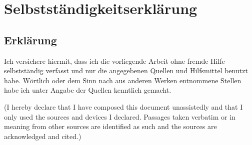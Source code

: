 \chapter*{Selbstständigkeitserklärung} %

\vspace{2cm}

\section*{Erklärung}

Ich versichere hiermit, dass ich die vorliegende Arbeit ohne fremde Hilfe selbstständig verfasst und nur die angegebenen Quellen und Hilfsmittel benutzt habe. Wörtlich oder dem Sinn nach aus anderen Werken entnommene Stellen habe ich unter Angabe der Quellen kenntlich gemacht.

\medskip
\noindent (I hereby declare that I have composed this document unassistedly and that I only used the sources and devices I declared. Passages taken verbatim or in meaning from other sources are identified as such and the sources are acknowledged and cited.)

\vspace{2cm}

\noindent \year